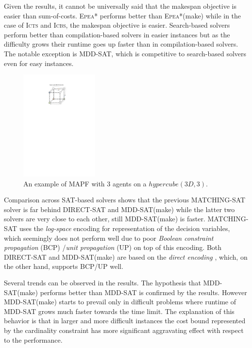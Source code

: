 \documentclass[jair,oneside,11pt]{article}
\begin{document}
Given the results, it cannot be universally said that the makespan objective is easier than sum-of-costs. \textsc{Epea}* performs better than \textsc{Epea}*(make) while in the case of \textsc{Icts} and \textsc{Icbs}, the makespan objective is easier. Search-based solvers perform better than compilation-based solvers in easier instances but as the difficulty grows their runtime goes up faster than in compilation-based solvers. The notable exception is MDD-SAT, which is competitive to search-based solvers even for easy instances.

\begin{figure}
\begin{center}
\includegraphics[trim={7.3cm 21.0cm 8.6cm 2.8cm},clip,width=0.35\textwidth]{fig_HYPER.pdf}
\end{center}
\caption{An example of MAPF with 3 agents on a $hypercube(3D, 3)$.} \label{figure-HYPER}
\end{figure}

Comparison across SAT-based solvers shows that the previous MATCHING-SAT solver is far behind DIRECT-SAT and MDD-SAT(make) while the latter two solvers are very close to each other, still MDD-SAT(make) is faster. MATCHING-SAT uses the {\em log-space} encoding \cite{DBLP:books/sp/Petke15} for representation of the decision variables, which seemingly does not perform well due to poor {\em Boolean constraint propagation} (BCP) /{\em unit propagation} (UP) \cite{DBLP:journals/jlp/DowlingG84} on top of this encoding. Both DIRECT-SAT and MDD-SAT(make) are based on the {\em direct encoding} \cite{DBLP:journals/constraints/TamuraTKB09}, which, on the other hand, supports BCP/UP well.

Several trends can be observed in the results. The hypothesis that MDD-SAT(make) performs better than MDD-SAT is confirmed by the results. However MDD-SAT(make) starts to prevail only in difficult problems where runtime of MDD-SAT grows much faster towards the time limit. The explanation of this behavior is that in larger and more difficult instances the cost bound represented by the cardinality constraint has more significant aggravating effect with respect to the performance.
\end{document}
